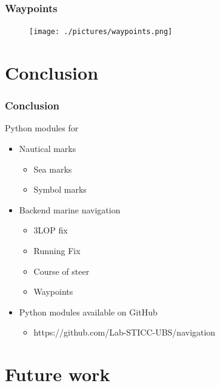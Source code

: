 \documentclass{beamer}
\begin{document}
\begin{frame}
    \frametitle{Waypoints}

        \begin{figure}[h]
        \centering
        \texttt{[image: ./pictures/waypoints.png]}
        \end{figure}
        
\end{frame}
    


\section{Conclusion}

\begin{frame}
\frametitle{Conclusion}
Python modules for 
    \begin{itemize}
        \item Nautical marks
        \begin{itemize}
            \item Sea marks
            \item Symbol marks
        \end{itemize}
        \item Backend marine navigation
        \begin{itemize}
            \item 3LOP fix
            \item Running Fix
            \item Course of steer
            \item Waypoints
        \end{itemize}
        \item Python modules available on GitHub
        \begin{itemize}
            \item https://github.com/Lab-STICC-UBS/navigation
        \end{itemize}
        
    \end{itemize}
\end{frame}

\section{Future work}
\end{document}
